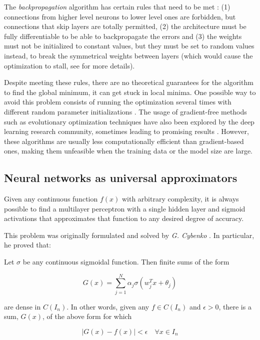 The \textit{backpropagation} algorithm has certain rules that need to be met \autocite{hinton1986}: (1) connections from higher level neurons to lower level ones are forbidden, but connections that skip layers are totally permitted, (2) the architecture must be fully differentiable to be able to backpropagate the errors and (3) the weights must not be initialized to constant values, but they must be set to random values instead, to break the symmetrical weights between layers (which would cause the optimization to stall, see \autocite{hinton1986} for more details). 

Despite meeting these rules, there are no theoretical guarantees for the algorithm to find the global minimum, it can get stuck in local minima. One possible way to avoid this problem consists of running the optimization several times with different random parameter initializations \autocite{haykin1998}. The usage of gradient-free methods such as evolutionary optimization techniques \autocite{sivanandam2008} have also been explored by the deep learning research community, sometimes leading to promising results \autocite{omid2014, vallesperez2012}. However, these algorithms are usually less computationally efficient than gradient-based ones, making them unfeasible when the training data or the model size are large.

\subsection{Neural networks as universal approximators}
Given any continuous function $f(x)$ with arbitrary complexity, it is always possible to find a multilayer perceptron with a single hidden layer and sigmoid activations that approximates that function to any desired degree of accuracy.

This problem was originally formulated and solved by \textit{G. Cybenko} \autocite{Cybenko1989}. In particular, he proved that:

\begin{thm}[ 2 - Cybenko, 1989]
	Let $\sigma$ be any continuous sigmoidal function. Then finite sums of the form

	$$ G(x) = \sum_{j=1}^{N} \alpha_j \sigma(w_j^Tx + \theta_j) $$

	are dense in $C(I_n)$. In other words, given any $f \in C(I_n)$ and $\epsilon > 0$, there is a sum, $G(x)$, of the above form for which

	$$|G(x) - f(x)| < \epsilon \quad \forall x \in I_n$$
\end{thm}

